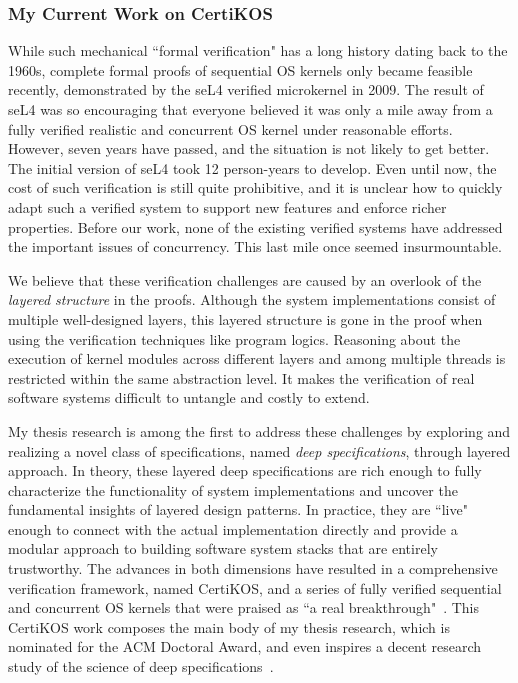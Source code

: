 \documentclass[a4paper, 10pt]{article}
\begin{document}
\begin{small}

\subsubsection*{\large My Current Work on CertiKOS}

While such mechanical ``formal verification" has a long history dating back to the 1960s, 
complete formal proofs of sequential OS kernels only became feasible recently, demonstrated by
the seL4 verified microkernel in 2009. The result of seL4 was so encouraging that everyone
believed it was only a mile away from a fully verified realistic and concurrent OS kernel under reasonable efforts. However, seven years have passed,
and the situation is not likely to get better. 
The initial version of seL4 took 12 person-years to develop.
Even until now, the cost of such verification is still quite prohibitive,
 and it is unclear how to quickly adapt such a verified system to support new features and enforce richer properties. 
Before our work, none of the existing verified systems have addressed the important
issues of concurrency.
This last mile once seemed insurmountable.

 
We believe that these verification challenges
are caused by an overlook of the \emph{layered structure} in the proofs.
Although the system implementations consist of multiple
well-designed layers, this layered structure
is gone in the proof when using the verification techniques like  program logics.
Reasoning about the execution of kernel modules across different layers and among multiple threads is restricted within 
the same abstraction level. It makes the verification
of real software systems  difficult to untangle
and costly to extend.

My thesis research is among the first to address these challenges
by exploring and realizing a novel class of specifications, named \emph{deep specifications}, through layered approach.
In theory, these layered deep specifications are rich
enough to fully characterize the functionality of system implementations
and
uncover the fundamental
insights of  layered design patterns. In practice, they are ``live" enough to  connect   with the actual  implementation directly and provide a modular approach to building
 software system stacks that are entirely trustworthy.
The advances in both dimensions have resulted in a comprehensive
verification framework, named CertiKOS, and
a series of fully verified sequential and concurrent OS kernels that were praised as ``a real breakthrough"~\cite{news, dnews}.
This CertiKOS work composes the main body of my thesis research, which is nominated for the ACM Doctoral Award,
and even inspires a decent research study of the science of deep specifications~\cite{deepspec}.



\end{small}
\end{document}
